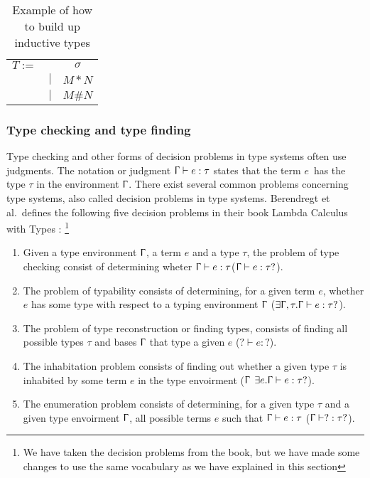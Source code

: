 \begin{table}[]
    \centering
    \begin{tabular}{c c c}
         $T :=$&  & $\sigma$\\
         & $|$ & $M * N$ \\
         & $|$ & $M \# N$ \\
    \end{tabular}
    \caption{Example of how to build up inductive types}
    \label{tab:inductive types}
\end{table}


\subsubsection{Type checking and type finding}
Type checking and other forms of decision problems in type systems often use judgments. The notation or judgment  $\Upgamma \vdash e:\tau$ states that the term $e$ has the type $\tau$ in the environment $\Upgamma$. There exist several common problems concerning type systems, also called decision problems in type systems. Berendregt et al.~defines the following five decision problems in their book Lambda Calculus with Types \autocite{nederpelt_geuvers_lc}: \footnote{We have taken the decision problems from the book, but we have made some changes to use the same vocabulary as we have explained in this section
}

\begin{enumerate}
    \item Given a type environment $\Upgamma$, a term $e$ and a type $\tau$, the problem of type checking consist of determining wheter $\Upgamma\vdash e : \tau$($\Upgamma\vdash e : \tau ?$).
    \item The problem of typability consists of determining, for a given term $e$, whether $e$ has some type with respect to a typing environment $\Upgamma$ ($ \exists \Upgamma,\tau .\Upgamma\vdash e : \tau ?$).
    \item The problem of type reconstruction or finding types, consists of finding all possible types $\tau$ and bases $\Upgamma$ that type a given $e$ ($ ? \vdash e : ?$).
    \item The inhabitation problem consists of finding out whether a given type $\tau$ is inhabited by some term $e$ in the type envoirment ($\Upgamma$ $ \exists e.\Upgamma \vdash e : \tau?$).
    \item The enumeration problem consists of determining, for a given type $\tau$ and a given type envoirment $\Upgamma$, all possible terms $e$ such that $\Upgamma\vdash e : \tau$ ($\Upgamma\vdash ? : \tau ?$).

\end{enumerate}


